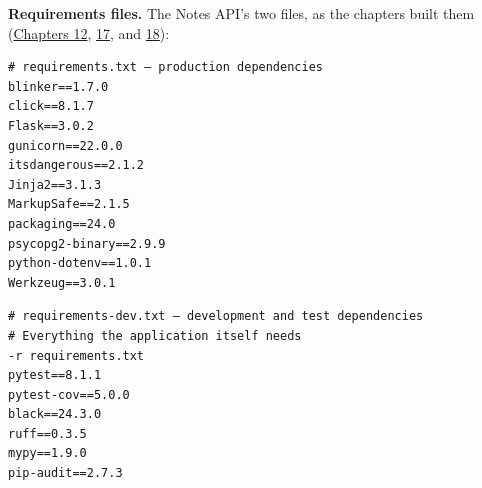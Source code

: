 \begin{codebox}

\begin{Shaded}
\begin{Highlighting}[]







\OperatorTok{\textgreater{}}
\end{Highlighting}
\end{Shaded}

\end{codebox}

\noindent{}\textbf{Requirements files.} The Notes API's two files, as the chapters built them (\hyperref[ch:12-dependency-declaration]{Chapters 12}, \hyperref[ch:17-build-process]{17}, and \hyperref[ch:18-containerization]{18}):

\begin{outputbox}[short]
\begin{Verbatim}[fontsize=\codesize, breaklines, breakanywhere, breaksymbolleft={\tiny\textcolor{muted}{$\hookrightarrow$}}]
# requirements.txt — production dependencies
blinker==1.7.0
click==8.1.7
Flask==3.0.2
gunicorn==22.0.0
itsdangerous==2.1.2
Jinja2==3.1.3
MarkupSafe==2.1.5
packaging==24.0
psycopg2-binary==2.9.9
python-dotenv==1.0.1
Werkzeug==3.0.1
\end{Verbatim}
\end{outputbox}

\begin{outputbox}[short]
\begin{Verbatim}[fontsize=\codesize, breaklines, breakanywhere, breaksymbolleft={\tiny\textcolor{muted}{$\hookrightarrow$}}]
# requirements-dev.txt — development and test dependencies
# Everything the application itself needs
-r requirements.txt
pytest==8.1.1
pytest-cov==5.0.0
black==24.3.0
ruff==0.3.5
mypy==1.9.0
pip-audit==2.7.3
\end{Verbatim}
\end{outputbox}

